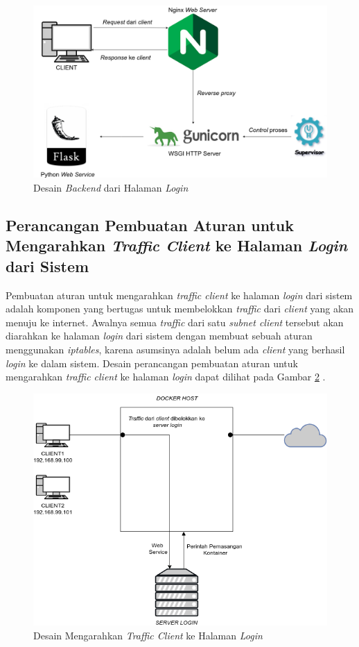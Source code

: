 	\begin{figure}[H]
		\centering
		\includegraphics[width=\linewidth]{images/bab3/DesainBackend}
		\caption{Desain \textit{Backend} dari Halaman \textit{Login}}
		\label{desainbackendhalamanlogin}
	\end{figure}
	
	\subsection{Perancangan Pembuatan Aturan untuk Mengarahkan \textit{Traffic Client} ke Halaman \textit{Login} dari Sistem}
	Pembuatan aturan untuk mengarahkan \textit{traffic client} ke halaman \textit{login} dari sistem adalah komponen yang bertugas untuk membelokkan \textit{traffic} dari \textit{client} yang akan menuju ke internet. Awalnya semua \textit{traffic} dari satu \textit{subnet client} tersebut akan diarahkan ke halaman \textit{login} dari sistem dengan membuat sebuah aturan menggunakan \textit{iptables}, karena asumsinya adalah belum ada \textit{client} yang berhasil \textit{login} ke dalam sistem. Desain perancangan pembuatan aturan untuk mengarahkan \textit{traffic client} ke halaman \textit{login} dapat dilihat pada Gambar \ref{dessainmengarahkankehalamanlogin} .
	\begin{figure}[H]
		\centering
		\includegraphics[width=\linewidth]{images/bab3/DIAGRAM2}
		\caption{Desain Mengarahkan \textit{Traffic Client} ke Halaman \textit{Login}}
		\label{dessainmengarahkankehalamanlogin}
	\end{figure}
	
